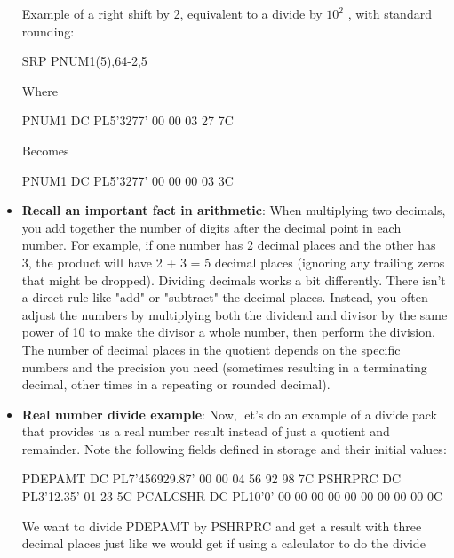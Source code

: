 \documentclass{report}
\begin{document}
\begin{itemize}
\begin{cppcode}
            \end{cppcode}
            \bigbreak \noindent 
            Example of a right shift by 2, equivalent to a divide by $10^{2}$ , with standard rounding:
            \bigbreak \noindent 
            \begin{cppcode}
            SRP PNUM1(5),64-2,5 
            \end{cppcode}
            \bigbreak \noindent 
            Where
            \bigbreak \noindent 
            \begin{cppcode}
            PNUM1 DC PL5'3277'     00 00 03 27 7C
            \end{cppcode}
            \bigbreak \noindent 
            Becomes
            \bigbreak \noindent 
            \begin{cppcode}
            PNUM1 DC PL5'3277' 00 00 00 03 3C
            \end{cppcode}
        \item \textbf{Recall an important fact in arithmetic}: When multiplying two decimals, you add together the number of digits after the decimal point in each number. For example, if one number has 2 decimal places and the other has 3, the product will have 2 + 3 = 5 decimal places (ignoring any trailing zeros that might be dropped).
            \bigbreak \noindent 
            Dividing decimals works a bit differently. There isn't a direct rule like "add" or "subtract" the decimal places. Instead, you often adjust the numbers by multiplying both the dividend and divisor by the same power of 10 to make the divisor a whole number, then perform the division. The number of decimal places in the quotient depends on the specific numbers and the precision you need (sometimes resulting in a terminating decimal, other times in a repeating or rounded decimal).
        \item \textbf{Real number divide example}: Now, let's do an example of a divide pack that provides us a real number result instead of just a quotient and remainder.
            \bigbreak \noindent 
            Note the following fields defined in storage and their initial values:
            \bigbreak \noindent 
            \begin{cppcode}
                PDEPAMT DC PL7'456929.87'    00 00 04 56 92 98 7C
                PSHRPRC DC PL3'12.35'        01 23 5C
                PCALCSHR DC PL10'0'          00 00 00 00 00 00 00 00 00 0C
            \end{cppcode}
            \bigbreak \noindent 
            We want to divide PDEPAMT by PSHRPRC and get a result with three decimal places just like we would get if using a calculator to do the divide

\end{itemize}
\end{document}
